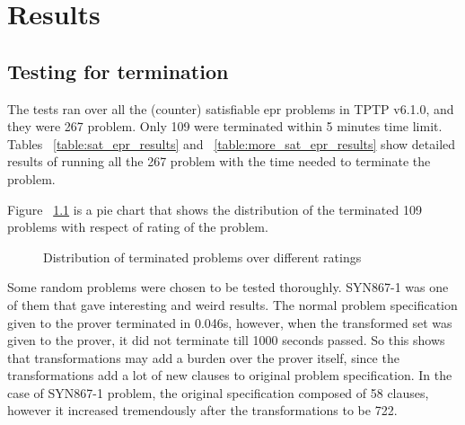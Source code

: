 \chapter{Results}\label{chap:res_and_lit}

\section{Testing for termination}


The tests ran over all the (counter) satisfiable \ac{epr} problems in TPTP v6.1.0, and they were 267 problem. Only 109 were terminated within 5 minutes time limit. Tables ~\ref{table:sat_epr_results} and ~\ref{table:more_sat_epr_results} show detailed results of running all the 267 problem with the time needed to terminate the problem.


Figure ~\ref{fig:res_dist} is a pie chart that shows the distribution of the terminated 109 problems with respect of rating of the problem. 


\begin{figure}[H]
\centering
{}
\caption{Distribution of terminated problems over different ratings\label{fig:res_dist}}
\end{figure}



Some random problems were chosen to be tested thoroughly. SYN867-1 was one of them that gave interesting and weird results. The normal problem specification given to the prover terminated in 0.046s, however, when the transformed set was given to the prover, it did not terminate till 1000 seconds passed. So this shows that transformations may add a burden over the prover itself, since the transformations add a lot of new clauses to original problem specification. In the case of SYN867-1 problem, the original specification composed of 58 clauses, however it increased tremendously after the transformations to be 722.



